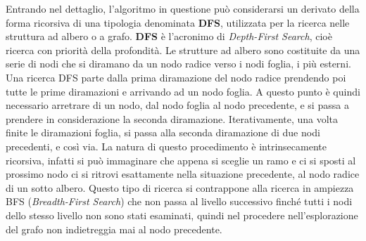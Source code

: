 \documentclass[12pt,a4paper,oneside]{book}
\begin{document}
		Entrando nel dettaglio, l'algoritmo in questione può considerarsi un derivato della forma ricorsiva di una tipologia denominata {\bf DFS}, utilizzata per la ricerca nelle struttura ad albero o a grafo. {\bf DFS} è l'acronimo di {\it Depth-First Search}, cioè ricerca con priorità della profondità. Le strutture ad albero sono costituite da una serie di nodi che si diramano da un nodo radice verso i nodi foglia, i più esterni. Una ricerca DFS parte dalla prima diramazione del nodo radice prendendo poi tutte le prime diramazioni e arrivando ad un nodo foglia. A questo punto è quindi necessario arretrare di un nodo, dal nodo foglia al nodo precedente, e si passa a prendere in considerazione la seconda diramazione. Iterativamente, una volta finite le diramazioni foglia, si passa alla seconda diramazione di due nodi precedenti, e così via. La natura di questo procedimento è intrinsecamente ricorsiva, infatti si può immaginare che appena si sceglie un ramo e ci si sposti al prossimo nodo ci si ritrovi esattamente nella situazione precedente, al nodo radice di un sotto albero. Questo tipo di ricerca si contrappone alla ricerca in ampiezza BFS ({\it Breadth-First Search}) che non passa al livello successivo finché tutti i nodi dello stesso livello non sono stati esaminati, quindi nel procedere nell'esplorazione del grafo non indietreggia mai al nodo precedente. 
		
\end{document}
